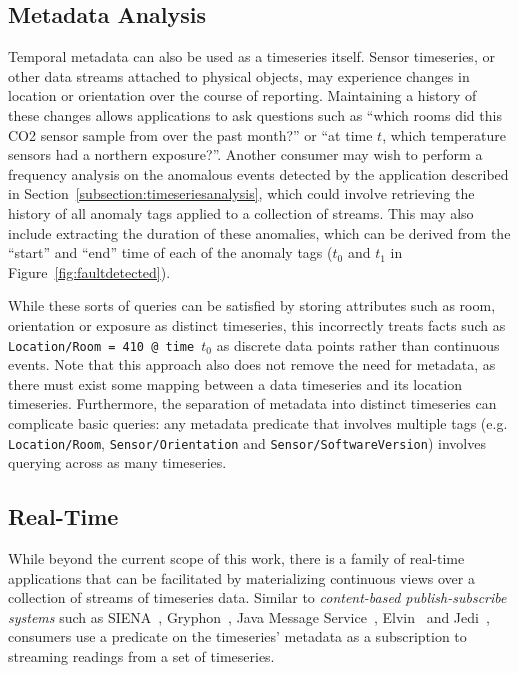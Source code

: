 \subsection{Metadata Analysis}

Temporal metadata can also be used as a timeseries itself. Sensor timeseries,
or other data streams attached to physical objects, may experience changes in
location or orientation over the course of reporting. Maintaining a history of
these changes allows applications to ask questions such as ``which rooms did
this CO2 sensor sample from over the past month?'' or ``at time $t$, which
temperature sensors had a northern exposure?''. Another consumer may wish to
perform a frequency analysis on the anomalous events detected by the
application described in Section~\ref{subsection:timeseriesanalysis}, which
could involve retrieving the history of all anomaly tags applied to a
collection of streams. This may also include extracting the duration of these
anomalies, which can be derived from the ``start'' and ``end'' time of each of
the anomaly tags ($t_0$ and $t_1$ in Figure~\ref{fig:faultdetected}).

While these sorts of queries can be satisfied by storing attributes such as
room, orientation or exposure as distinct timeseries, this incorrectly treats
facts such as \texttt{Location/Room = 410 @ time $t_0$} as discrete data points
rather than continuous events. Note that this approach also does not remove the
need for metadata, as there must exist some mapping between a data timeseries
and its location timeseries.  Furthermore, the separation of metadata into
distinct timeseries can complicate basic queries: any metadata predicate that
involves multiple tags (e.g. \texttt{Location/Room},
\texttt{Sensor/Orientation} and \texttt{Sensor/SoftwareVersion}) involves
querying across as many timeseries.

\subsection{Real-Time}

While beyond the current scope of this work, there is a family of real-time
applications that can be facilitated by materializing continuous views over a
collection of streams of timeseries data. Similar to \emph{content-based
publish-subscribe systems} such as SIENA~\cite{carzaniga2000achieving},
Gryphon~\cite{strom1998gryphon}, Java Message Service~\cite{hapner2002java},
Elvin~\cite{segall1997elvin} and Jedi~\cite{cugola2001jedi}, consumers use a
predicate on the timeseries' metadata as a subscription to streaming readings
from a set of timeseries.

